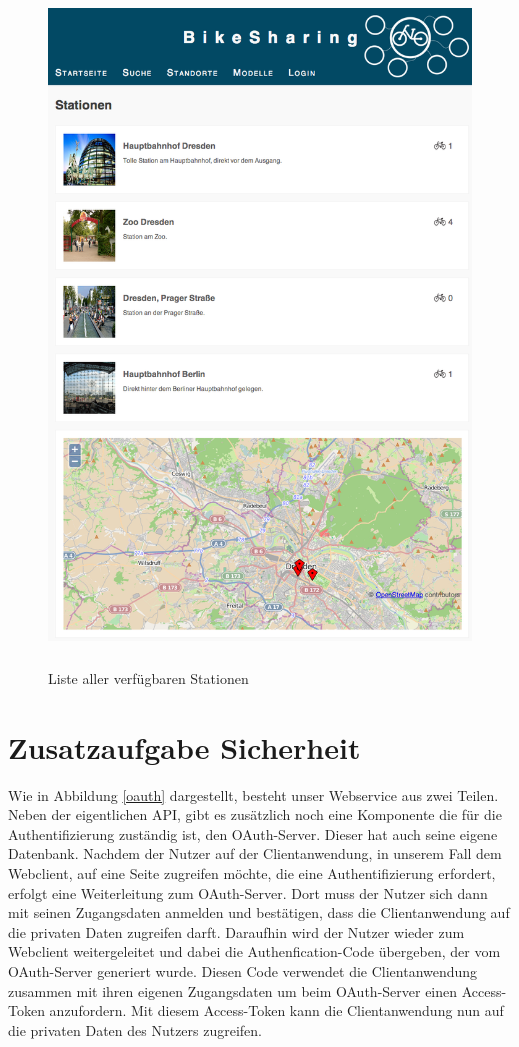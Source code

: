 \begin{figure}[h]
        \centering
	\includegraphics[height=180mm]{pics/bikesharing_stations.png}
	\caption{Liste aller verfügbaren Stationen}
\end{figure}

\chapter{Zusatzaufgabe Sicherheit}

Wie in Abbildung \ref{oauth} dargestellt, besteht unser Webservice aus zwei Teilen. Neben der eigentlichen API, gibt es zusätzlich noch eine Komponente die für die Authentifizierung zuständig ist, den OAuth-Server. Dieser hat auch seine eigene Datenbank. Nachdem der Nutzer auf der Clientanwendung, in unserem Fall dem Webclient, auf eine Seite zugreifen möchte, die eine Authentifizierung erfordert, erfolgt eine Weiterleitung zum OAuth-Server. Dort muss der Nutzer sich dann mit seinen Zugangsdaten anmelden und bestätigen, dass die Clientanwendung auf die privaten Daten zugreifen darft. Daraufhin wird der Nutzer wieder zum Webclient weitergeleitet und dabei die Authenfication-Code übergeben, der vom OAuth-Server generiert wurde. Diesen Code verwendet die Clientanwendung zusammen mit ihren eigenen Zugangsdaten um beim OAuth-Server einen Access-Token anzufordern. Mit diesem Access-Token kann die Clientanwendung nun auf die privaten Daten des Nutzers zugreifen.

